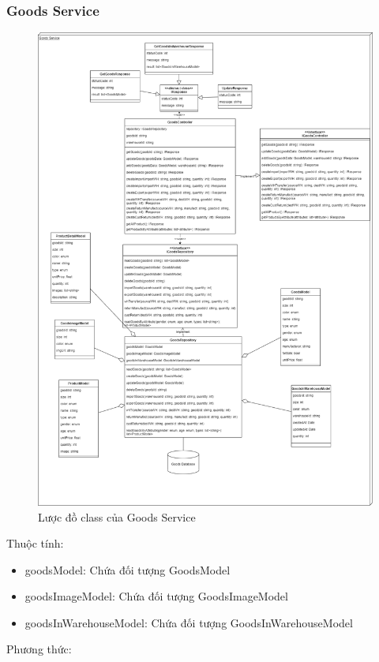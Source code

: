 \subsubsection{Goods Service}
\begin{figure}[!htp]
	\centering
	\includegraphics[width=13cm]{img/Architecture/service/GoodsService.png}
	\newline
	\caption{Lược đồ class của Goods Service}
\end{figure}
Thuộc tính:
\begin{itemize}
	\item goodsModel: Chứa đối tượng GoodsModel
	\item goodsImageModel: Chứa đối tượng GoodsImageModel
	\item goodsInWarehouseModel: Chứa đối tượng GoodsInWarehouseModel
\end{itemize}
Phương thức:
